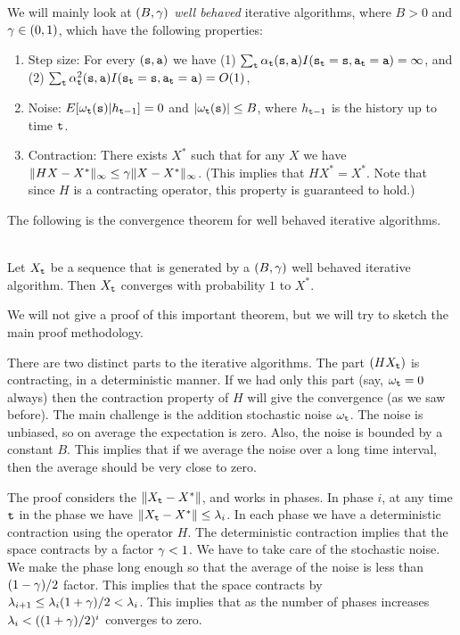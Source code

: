We will mainly look at {\em $(B,\gamma)$ well behaved} iterative
algorithms, where $B>0$ and $\gamma\in(0,1)$, which have the
following properties:
\begin{enumerate}
\item Step size: For every $({\tt s},{\tt a})$ we have (1) $\sum_{\tt t}
\alpha_{\tt t}({\tt s},{\tt a})
I({\tt s}_{\tt t}={\tt s},{\tt a}_{\tt t}={\tt a})=\infty $, and (2)
$\sum_{\tt t} \alpha_{\tt t}^2({\tt s},{\tt a})
I({\tt s}_{\tt t}={\tt s},{\tt a}_{\tt t}={\tt a})=O(1)$,
\item Noise: $E[\omega_{\tt t}({\tt s})|h_{{\tt t}-1}]=0$ and $|\omega_{\tt t}({\tt s})|\leq B$, where
$h_{{\tt t}-1}$ is the history up to time ${\tt t}$.
\item Contraction: There exists $X^*$ such that for any $X$ we have $\|HX-X^*\|_\infty
\leq \gamma \|X-X^*\|_\infty$. (This implies that $HX^*=X^*$.
Note that since $H$ is a contracting operator, this property is
guaranteed to hold.)
\end{enumerate}

The following is the convergence theorem for well behaved iterative
algorithms.

\begin{theorem}\ \\
\label{thm:stoch-approx}
 Let $X_{\tt t}$ be a sequence that is generated by a
$(B,\gamma)$ well behaved iterative algorithm. Then $X_{\tt t}$
converges with probability $1$ to $X^*$.
\end{theorem}

We will not give a proof of this important theorem, but we will try
to sketch the main proof methodology.

There are two distinct parts to the iterative algorithms. The part
$(HX_{\tt t})$ is contracting, in a deterministic manner. If we had
only this part (say, $\omega_{\tt t}=0$ always) then the contraction
property of $H$ will give the convergence (as we saw before). The
main challenge is the addition stochastic noise $\omega_{\tt t}$. The
noise is unbiased, so on average the expectation is zero. Also, the
noise is bounded by a constant $B$. This implies that if we average
the noise over a long time interval, then the average should be very
close to zero.

The proof considers the $\|X_{\tt t}-X^*\|$, and  works in phases. In
phase $i$, at any time ${\tt t}$ in the phase we have
$\|X_{\tt t}-X^*\|\leq \lambda_i$.
%
In each phase we have a deterministic contraction using the operator
$H$. The deterministic contraction implies that
the space contracts by a factor $\gamma<1$. We have to take care
of the stochastic noise. We make the phase long enough so that the
average of the noise is less than $(1-\gamma)/2$ factor. This
implies that the space contracts by
$\lambda_{i+1}\leq\lambda_i(1+\gamma)/2<\lambda_i $. This implies
that as the number of phases increases $\lambda_i<
((1+\gamma)/2)^i$ converges to zero.

